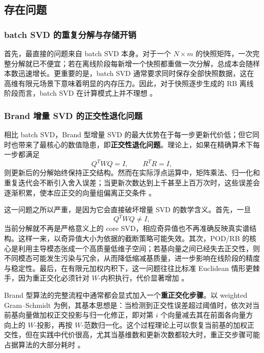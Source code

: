 \subsection{存在问题}

\subsubsection{batch SVD 的重复分解与存储开销}

首先，最直接的问题来自 batch SVD 本身。对于一个 $N\times m$ 的快照矩阵，一次完整分解就已不便宜；若在离线阶段每新增一个快照都重做一次分解，总成本会随样本数迅速增长。更重要的是，batch SVD 通常要求同时保存全部快照数据，这在高维有限元场景下意味着明显的内存压力。因此，对于快照逐步生成的 RB 离线阶段而言，batch SVD 在计算模式上并不理想 \cite{brand2002,brand2006,fareed2018}。

\subsubsection{Brand 增量 SVD 的正交性退化问题}

相比 batch SVD，Brand 型增量 SVD 的最大优势在于每一步更新代价低；但它同时也带来了最核心的数值隐患，即\textbf{正交性退化问题}。理论上，如果在精确算术下每一步都满足
\[
Q^T W Q=I,\qquad R^TR=I,
\]
则更新后的分解始终保持正交结构。然而在实际浮点运算中，矩阵乘法、归一化和重复迭代会不断引入舍入误差；当更新次数达到上千甚至上百万次时，这些误差会逐渐积累，使本应正交的向量组偏离正交条件 \cite{brand2006,zhang2022}。

这一问题之所以严重，是因为它会直接破坏增量 SVD 的数学含义。首先，一旦
\[
Q^T W Q\neq I,
\]
当前分解就不再是严格意义上的 core SVD，相应奇异值也不再准确反映真实谱结构。这样一来，以奇异值大小为依据的截断策略可能失效。其次，POD/RB 的核心是利用主导模态张成一个高质量低维子空间；若基向量之间已经失去正交性，则不同模态可能发生污染与冗余，从而降低缩减基质量，进一步影响在线阶段的精度与稳定性。最后，在有限元加权内积下，这一问题往往比标准 Euclidean 情形更棘手，因为重正交化必须针对 $W$-内积执行，代价显著增加 \cite{fareed2018,zhang2022}。

Brand 型算法的完整流程中通常都会显式加入一个\textbf{重正交化步骤}。以 weighted Gram--Schmidt 为例，其基本思想是：当检测到正交性误差超过阈值时，依次对当前基向量做加权正交投影与归一化修正，即对第 $i$ 个向量减去其在前面各向量方向上的 $W$-投影，再按 $W$-范数归一化。这个过程理论上可以恢复当前基的加权正交性，但在实践中代价很高，尤其当基维数和更新次数都较大时，重正交步骤可能占据算法的大部分耗时 \cite{zhang2022}。

